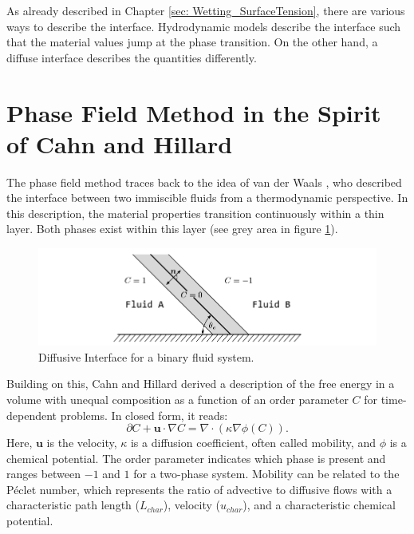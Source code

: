 
As already described in Chapter \ref{sec: Wetting_SurfaceTension}, there are various ways to describe the interface. Hydrodynamic models describe the interface such that the material values jump at the phase transition. On the other hand, a diffuse interface describes the quantities differently. 

\section{Phase Field Method in the Spirit of Cahn and Hillard}
The phase field method traces back to the idea of van der Waals \cite{vanderwaals1979ThermodynamicTheoryCapillarity}, who described the interface between two immiscible fluids from a thermodynamic perspective. In this description, the material properties transition continuously within a thin layer. Both phases exist within this layer (see grey area in figure \ref{fig: DiffusiveInterface}).
\begin{figure}[h]
    \centering
    \includegraphics[width=.95\textwidth]{Pictures/DiffusiveInterface.pdf}
    \caption{Diffusive Interface for a binary fluid system. }
    \label{fig: DiffusiveInterface}
\end{figure}


Building on this, Cahn and Hillard \cite{johnw.FreeEnergyNonuniform1958} derived a description of the free energy in a volume with unequal composition as a function of an order parameter $C$ for time-dependent problems. In closed form, it reads:
\begin{equation}
\label{eq: CahnHillard}
    \partial C + \textbf{u} \cdot \nabla C = \nabla \cdot \left(\kappa \nabla \phi(C)\right).
\end{equation}
Here, $\textbf{u}$ is the velocity, $\kappa$ is a diffusion coefficient, often called mobility, and $\phi$ is a chemical potential. The order parameter indicates which phase is present and ranges between $-1$ and $1$ for a two-phase system. Mobility can be related to the Péclet number, which represents the ratio of advective to diffusive flows with a characteristic path length ($L_{char}$), velocity ($u_{char}$), and a characteristic chemical potential\cite{cai2015NumericalSimulationWetting, holzinger2021DirectNumericalSimulation}.


